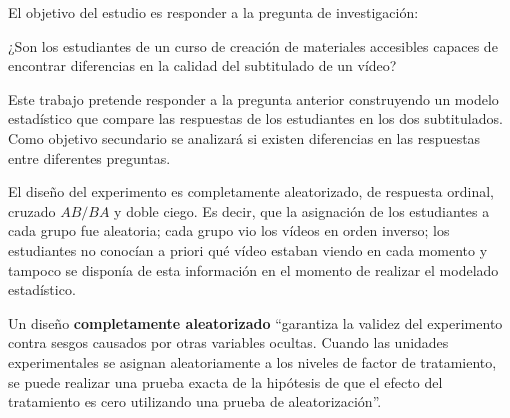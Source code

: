 \documentclass[
  12pt,
  a4paper,
  extrafontsizes,
  onecolumn,
  openright,
  table]{memoir}
\begin{document}
El objetivo del estudio es responder a la pregunta de investigación:

\begin{tcolorbox}[enhanced jigsaw, left=2mm, toprule=.15mm, bottomrule=.15mm, colframe=quarto-callout-note-color-frame, bottomtitle=1mm, coltitle=black, breakable, opacityback=0, toptitle=1mm, title=\textcolor{quarto-callout-note-color}{\faInfo}\hspace{0.5em}{Pregunta de investigación}, colback=white, arc=.35mm, rightrule=.15mm, opacitybacktitle=0.6, leftrule=.75mm, titlerule=0mm, colbacktitle=quarto-callout-note-color!10!white]

¿Son los estudiantes de un curso de creación de materiales accesibles
capaces de encontrar diferencias en la calidad del subtitulado de un
vídeo?

\end{tcolorbox}

Este trabajo pretende responder a la pregunta anterior construyendo un
modelo estadístico que compare las respuestas de los estudiantes en los
dos subtitulados. Como objetivo secundario se analizará si existen
diferencias en las respuestas entre diferentes preguntas.

El diseño del experimento es completamente aleatorizado, de respuesta
ordinal, cruzado \(AB/BA\) y doble ciego. Es decir, que la asignación de
los estudiantes a cada grupo fue aleatoria; cada grupo vio los vídeos en
orden inverso; los estudiantes no conocían a priori qué vídeo estaban
viendo en cada momento y tampoco se disponía de esta información en el
momento de realizar el modelado estadístico.

Un diseño \textbf{completamente aleatorizado}
\autocite[pp.~18]{lawson2015} \enquote{garantiza la validez del
experimento contra sesgos causados por otras variables ocultas. Cuando
las unidades experimentales se asignan aleatoriamente a los niveles de
factor de tratamiento, se puede realizar una prueba exacta de la
hipótesis de que el efecto del tratamiento es cero utilizando una prueba
de aleatorización}.
\end{document}
